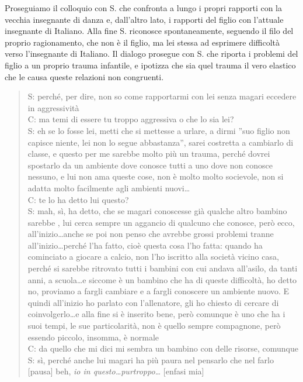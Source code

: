 \noindent Proseguiamo il colloquio con S. che confronta a lungo i propri rapporti con la vecchia insegnante di danza e, dall'altro lato, i rapporti del figlio con l'attuale insegnante di Italiano. Alla fine S. riconosce spontaneamente, seguendo il filo del proprio ragionamento, che non è il figlio, ma lei stessa ad esprimere difficoltà verso l'insegnante di Italiano. Il dialogo prosegue con S. che riporta i problemi del figlio a un proprio trauma infantile, e ipotizza che sia quel trauma il vero elastico che le causa queste relazioni non congruenti.

\begin{verse}
S: perché, per dire, non so come rapportarmi con lei senza magari eccedere in aggressività\\
C: ma temi di essere tu troppo aggressiva o che lo sia lei?\\
S: eh se lo fosse lei, metti che si mettesse a urlare, a dirmi ''suo figlio non capisce niente, lei non lo segue abbastanza'', sarei costretta a cambiarlo di classe, e questo per me sarebbe molto più un trauma, perché dovrei spostarlo da un ambiente dove conosce tutti a uno dove non conosce nessuno, e lui non ama queste cose, non è molto molto socievole, non si adatta molto facilmente agli ambienti nuovi\ldots\\
C: te lo ha detto lui questo?\\
S: mah, sì, ha detto, che se magari conoscesse già qualche altro bambino sarebbe , lui cerca sempre un aggancio di qualcuno che conosce, però ecco, all'inizio\ldots{}anche se poi non penso che avrebbe grossi problemi tranne all'inizio\ldots{}perché l'ha fatto, cioè questa cosa l'ho fatta: quando ha cominciato a giocare a calcio, non l'ho iscritto alla società vicino casa, perché si sarebbe ritrovato tutti  i bambini con cui andava all'asilo, da tanti anni, a scuola\ldots{}e siccome è un bambino che ha di queste difficoltà, ho detto no, proviamo a fargli cambiare e a fargli conoscere un ambiente nuovo. E quindi all'inizio ho parlato con l'allenatore, gli ho chiesto di cercare di coinvolgerlo\ldots{}e alla fine si è inserito bene, però comunque è uno che ha i suoi tempi, le sue particolarità, non è quello sempre compagnone, però essendo piccolo, insomma, è normale\\
C: da quello che mi dici mi sembra un bambino con delle risorse, comunque\\
S: sì, perché anche lui magari ha più paura nel pensarlo che nel farlo [pausa] beh,\emph{ io in questo\ldots{}purtroppo\ldots} [enfasi mia]\\

\end{verse}
